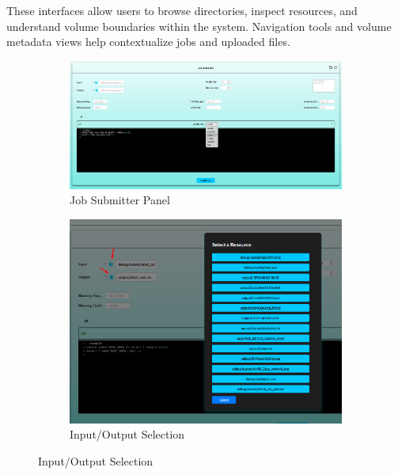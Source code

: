 \vspace{0.5em}
\noindent
These interfaces allow users to browse directories, inspect resources, and 
understand volume boundaries within the system. Navigation tools and volume 
metadata views help contextualize jobs and uploaded files.


\newpage
\begin{figure}[!htbp]
    \centering
    \begin{subfigure}[b]{0.48\textwidth}
        \includegraphics[width=\textwidth]{Images/kuspace_jobSubmitter.png}
        \caption{Job Submitter Panel}
        \label{fig:jobsubmitter}
    \end{subfigure}
    \hfill
    \begin{subfigure}[b]{0.48\textwidth}
        \includegraphics[width=\textwidth]{Images/kuspace_jobSubmitter_selectIO.png}
        \caption{Input/Output Selection}
        \label{fig:jobsubmitterselect}
    \end{subfigure}

    \vspace{1em}


\end{figure}

